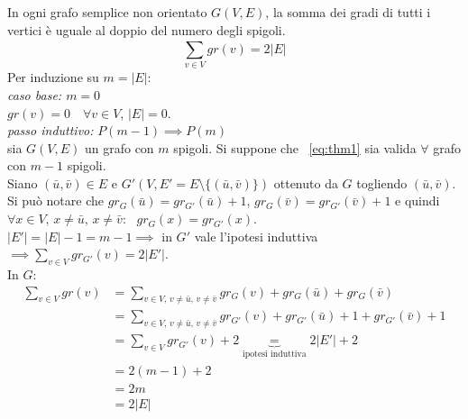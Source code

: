 \begin{thm}
In ogni grafo semplice non orientato $G(V,E)$, la somma dei gradi di tutti i vertici è
uguale al doppio del numero degli spigoli.
\begin{equation} \label{eq:thm1} \sum_{v \in V}^{} gr(v) = 2|E| \end{equation}
\proof
	Per induzione su $m = |E|$:\\
	\emph{caso base: $m = 0$}\\	
	\indent $gr(v) = 0 \quad \forall v \in V$, \quad $|E| = 0$.\\
	\emph{passo induttivo:} $P(m-1) \implies P(m)$\\
	\indent sia $G(V,E)$ un grafo con $m$ spigoli. Si suppone che ~\ref{eq:thm1} 
	sia valida $\forall$ grafo con $m-1$ spigoli.\\
	Siano $(\bar{u}, \bar{v}) \in E$ e $G'(V, E'=E \setminus \{(\bar{u}, \bar{v})\})$ ottenuto da $G$ togliendo 
	$(\bar{u}, \bar{v})$.\\
	Si può notare che $gr_G(\bar{u})= gr_{G'}(\bar{u})+1$, $gr_G(\bar{v}) = gr_{G'}(\bar{v})+1$ e quindi
	${\forall x \in V \text{, } x \neq \bar{u} \text{, }  x \neq \bar{v}: \text{ } gr_G(x) = gr_{G'}(x)}$.\\%
	$|E'| = |E|-1 = m -1 \implies$ in $G'$ vale l'ipotesi induttiva 
    ${\implies \sum_{v \in V}^{} gr_{G'}(v) = 2|E'|}$.\\In $G$:
    \begin{equation*}%
    \begin{split}
	 \sum_{v \in V}^{} gr(v) & = 
     \sum_{v \in V \text{, } v \neq \bar{u} \text{, } v \neq \bar{v} }^{} 
        gr_G(v)+gr_G(\bar{u})+gr_G(\bar{v}) \\ & =
	 \sum_{v\in V\text{, }v\neq \bar{u}\text{, } v\neq \bar{v} }^{} 
        gr_{G'}(v)+gr_{G'}(\bar{u})+1 +gr_{G'}(\bar{v}) +1 \\ & =
	 \sum_{v \in V}^{} gr_{G'}(v) + 2 \underbrace{=}_{\text{ipotesi induttiva}} 2|E'| + 2 \\
     & = 2(m-1) + 2 \\
	 & = 2m \\ & = 2|E|
    \end{split}
    \end{equation*}
\endproof
\end{thm}

